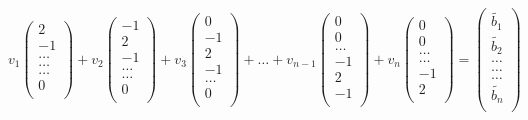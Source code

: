 \documentclass[12pt,a4wide]{article}
\begin{document}
\begin{equation}
{v_1}
	\left(\begin{array}{c}
                           2\\
                           -1\\
                           \dots \\
                          \dots  \\
                          \dots \\
                           0\\
                      \end{array} \right) +
{v_2} 
\left(\begin{array}{c}
-1\\
2\\
-1\\
\dots \\
\dots \\
0\\
\end{array} \right) + 
{v_3}
\left(\begin{array}{c}
0\\
-1\\
2\\
-1\\
\dots \\
0\\
\end{array} \right) + \dots +
{v_{n-1}}
\left(\begin{array}{c}
0\\
0\\
\dots\\
-1 \\
2 \\
-1\\
\end{array} \right) +
{v_n}
\left(\begin{array}{c}
0\\
0\\
\dots\\
\dots \\
-1 \\
2\\
\end{array} \right) = 
\left(\begin{array}{c}
\tilde{b_1}\\
\tilde{b_2}\\
\dots\\
\dots \\
\dots \\
\tilde{b_n}\\
\end{array} \right)
\end{equation}
\end{document}
